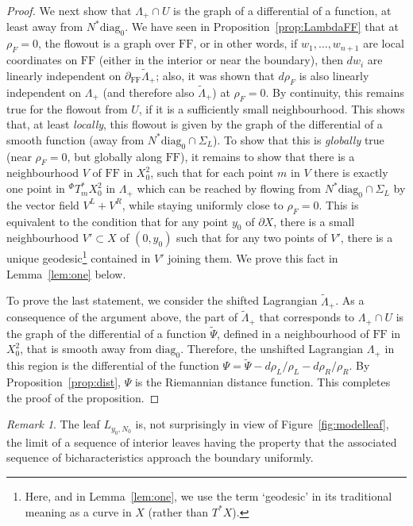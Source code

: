 \documentclass[10pt, a4paper, twoside]{amsart}
\numberwithin{equation}{section}
\theoremstyle{remark}
\newtheorem{remark}[theorem]{Remark}
\begin{document}
\begin{proof}
We next show that $\Lambda_+ \cap U$ is the graph of a differential of a function, at least away from $N^* {\mathrm{diag}_0}$. We have seen in Proposition~\ref{prop:LambdaFF} that at $\rho_F = 0$, the flowout is a graph over ${\mathrm{FF}}$, or in other words, if $w_1, \dots, w_{n+1}$ are local coordinates on ${\mathrm{FF}}$ (either in the interior or near the boundary), then $dw_i$ are linearly independent on $\partial_{\mathrm{FF}} {\tilde \Lambda}_+$; also, it was shown that $d\rho_F$ is also linearly independent on $\Lambda_+$ (and therefore also ${\tilde \Lambda}_+$) at $\rho_F = 0$. By continuity, this remains true for the flowout from $U$, if it is a  sufficiently small neighbourhood. 
This shows that, at least \emph{locally},  this flowout is given by the graph of the differential of a smooth function (away from $N^* {\mathrm{diag}_0} \cap \Sigma_L$).  To show that this is \emph{globally} true (near $\rho_F = 0$, but globally along ${\mathrm{FF}}$), it remains to show that there is a neighbourhood $V$ of ${\mathrm{FF}}$ in $X^2_0$, such that for each point $m$ in $V$ there is exactly one point in ${}^\Phi T^*_m X^2_0$ in $\Lambda_+$ which can be reached by flowing from $N^* {\mathrm{diag}_0} \cap \Sigma_L$ by the vector field $V^L + V^R$, while staying uniformly close to $\rho_F = 0$.  This is equivalent to the condition that for any point $y_0$ of $\partial X$, there is a small neighbourhood $V' \subset X$ of $(0, y_0)$ such that for any two points of $V'$,  there is a unique geodesic\footnote{Here, and in Lemma~\ref{lem:one},  we use the term `geodesic' in its traditional meaning as a curve in $X$ (rather than $T^* X$).} contained in $V'$ joining them. 
We prove this fact in Lemma~\ref{lem:one} below. 

To prove the last statement, we consider the shifted Lagrangian ${\tilde \Lambda}_+$. As a consequence of the argument above, the part of ${\tilde \Lambda}_+$ that corresponds to $\Lambda_+ \cap U$  is the graph of the differential of a function $\tilde \Psi$, defined in a neighbourhood of ${\mathrm{FF}}$ in $X^2_0$, that is smooth away from ${\mathrm{diag}_0}$. Therefore, the unshifted Lagrangian $\Lambda_+$ in this region is the differential of the function $\Psi = \tilde \Psi - d\rho_L/\rho_L - d\rho_R/\rho_R$. By Proposition~\ref{prop:dist}, $\Psi$ is the Riemannian distance function. This completes the proof of the proposition. 
\end{proof}

\begin{remark} The leaf $L_{y_0, N_0}$ is, not surprisingly in view of Figure~\ref{fig:modelleaf}, the limit of a sequence of interior leaves having the property that the associated sequence of bicharacteristics approach the boundary uniformly. 
\end{remark} 
\end{document}
